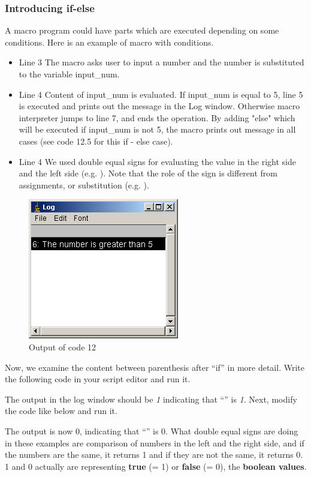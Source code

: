 \subsubsection{Introducing if-else}
A macro program could have parts which are executed depending on some
conditions.
Here is an example of macro with conditions.

\begin{itemize}
\item Line 3 The macro asks user to input a number and the number is substituted to the variable input\_num.
\item Line 4 Content of input\_num is evaluated. If input\_num is equal to 5, line 5 is executed and prints out the message in the Log window. Otherwise macro interpreter jumps to line 7, and ends the operation.  By adding "else" which will be executed if input\_num is not 5, the macro prints out message in all cases (see code 12.5 for this if - else case). 
\item Line 4 We used double equal signs for evaluating the value in the right side and the left side (e.g. ). 
Note that the role of the sign \ilcom{=} is different from assignments, or substitution (e.g. ).
\end{itemize}
\begin{figure}[htbp]
\begin{center}
\includegraphics[scale=0.6]{fig/fig2341_code12out.png}
\caption{Output of code 12}
\label{fig:code12 output}
\end{center}
\end{figure} 

Now, we examine the content between 
parenthesis after ``if'' in more detail. 
Write the following code in your script editor and run it.

The output in the log window should be \textit{1} indicating that ``'' is \textit{1}. Next, modify the code like below and run it.

The output is now 0, indicating that ``'' is
0.
What double equal signs \ilcom{==} are doing in these
examples are comparison of numbers in the left and the right side, and if
the numbers are the same, it returns 1 and if they are not the same, it returns 0. 1 and
0 actually are representing \textbf{true} (= 1) or \textbf{false} (= 0), the
\textbf{boolean values}.

